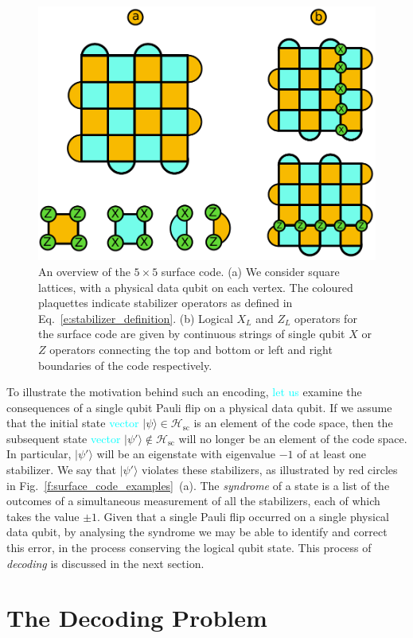 \documentclass[twocolumn,preprintnumbers,amsmath,amssymb,notitlepage,nofootinbib,longbibliography,superscriptaddress,aps,pra,10pt]{revtex4-1}
\newcommand{\je}[1]{\textcolor{cyan}{#1}}
\begin{document}
	\begin{figure}
		\centering
		\includegraphics[width=0.8\linewidth]{figures/surface_code.pdf}
		\caption{
			An overview of the $5 \times 5$ surface code.
			(a) We consider square lattices, with a physical data qubit on each vertex.
			The coloured plaquettes indicate stabilizer operators as defined in Eq.~\eqref{e:stabilizer_definition}.
			(b) Logical $X_L$ and $Z_L$ operators for the surface code are given by continuous strings of single qubit $X$ or $Z$ operators connecting the top and bottom or left and right boundaries of the code respectively.
		}
		\label{f:surface_code}
	\end{figure}

	To illustrate the motivation behind such an encoding, \je{let us} examine the consequences of a single qubit Pauli flip on a physical data qubit.
	If we assume that the initial state \je{vector} $|\psi\rangle \in \mathcal{H}_\mathrm{sc}$ is an element of the code space, then the subsequent state 
	\je{vector} $|\psi'\rangle \not \in \mathcal{H}_\mathrm{sc}$ will no longer be an element of the code space.
	In particular, $|\psi'\rangle$ will be an eigenstate with eigenvalue $-1$ of at least one stabilizer.
	We say that $|\psi'\rangle$ violates these stabilizers, as illustrated by red circles in Fig.~\ref{f:surface_code_examples}~(a).
	The \textit{syndrome} of a state is a list of the outcomes of a simultaneous measurement of all the stabilizers, each of which takes the value $\pm 1$.
	Given that a single Pauli flip occurred on a single physical data qubit, by analysing the syndrome we may be able to identify and correct this error, in the process conserving the logical qubit state. 
	This process of \textit{decoding} is discussed in the next section.

\section{The Decoding Problem}\label{s:the_decoding_problem}
\end{document}

